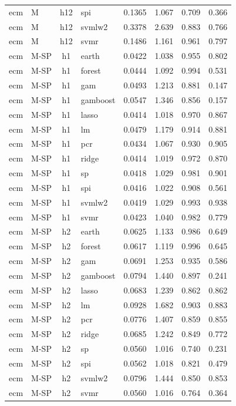 \begin{ThreePartTable}
\begin{longtable}[t]{llclcccc}
ecm & M & h12 & spi & 0.1365 & 1.067 & 0.709 & 0.366\\
ecm & M & h12 & svmlw2 & 0.3378 & 2.639 & 0.883 & 0.766\\
ecm & M & h12 & svmr & 0.1486 & 1.161 & 0.961 & 0.797\\
\addlinespace
ecm & M-SP & h1 & earth & 0.0422 & 1.038 & 0.955 & 0.802\\
ecm & M-SP & h1 & forest & 0.0444 & 1.092 & 0.994 & 0.531\\
ecm & M-SP & h1 & gam & 0.0493 & 1.213 & 0.881 & 0.147\\
ecm & M-SP & h1 & gamboost & 0.0547 & 1.346 & 0.856 & 0.157\\
ecm & M-SP & h1 & lasso & 0.0414 & 1.018 & 0.970 & 0.867\\
ecm & M-SP & h1 & lm & 0.0479 & 1.179 & 0.914 & 0.881\\
ecm & M-SP & h1 & pcr & 0.0434 & 1.067 & 0.930 & 0.905\\
ecm & M-SP & h1 & ridge & 0.0414 & 1.019 & 0.972 & 0.870\\
ecm & M-SP & h1 & sp & 0.0418 & 1.029 & 0.981 & 0.901\\
ecm & M-SP & h1 & spi & 0.0416 & 1.022 & 0.908 & 0.561\\
ecm & M-SP & h1 & svmlw2 & 0.0419 & 1.029 & 0.993 & 0.938\\
ecm & M-SP & h1 & svmr & 0.0423 & 1.040 & 0.982 & 0.779\\
\addlinespace
ecm & M-SP & h2 & earth & 0.0625 & 1.133 & 0.986 & 0.649\\
ecm & M-SP & h2 & forest & 0.0617 & 1.119 & 0.996 & 0.645\\
ecm & M-SP & h2 & gam & 0.0691 & 1.253 & 0.935 & 0.586\\
ecm & M-SP & h2 & gamboost & 0.0794 & 1.440 & 0.897 & 0.241\\
ecm & M-SP & h2 & lasso & 0.0683 & 1.239 & 0.862 & 0.862\\
ecm & M-SP & h2 & lm & 0.0928 & 1.682 & 0.903 & 0.883\\
ecm & M-SP & h2 & pcr & 0.0776 & 1.407 & 0.859 & 0.855\\
ecm & M-SP & h2 & ridge & 0.0685 & 1.242 & 0.849 & 0.772\\
ecm & M-SP & h2 & sp & 0.0560 & 1.016 & 0.740 & 0.231\\
ecm & M-SP & h2 & spi & 0.0562 & 1.018 & 0.821 & 0.479\\
ecm & M-SP & h2 & svmlw2 & 0.0796 & 1.444 & 0.850 & 0.853\\
ecm & M-SP & h2 & svmr & 0.0560 & 1.016 & 0.764 & 0.364\\

\end{longtable}
\end{ThreePartTable}
